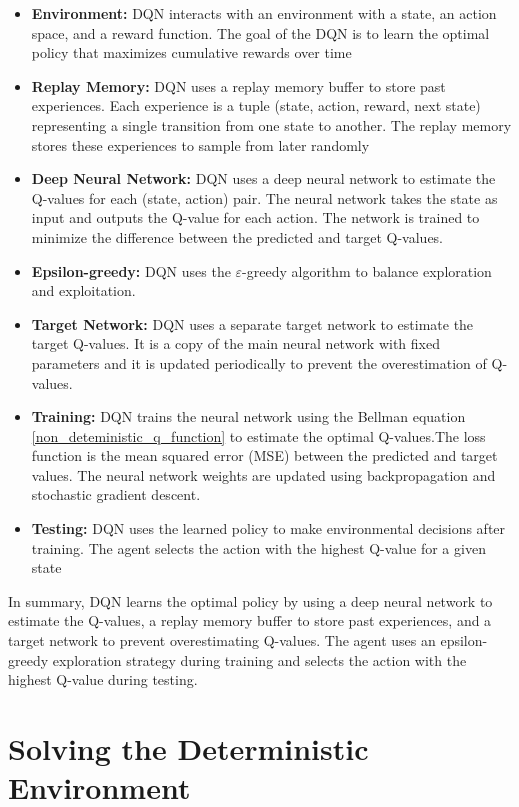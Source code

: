 \begin{itemize}
    \item \textbf{Environment:} DQN interacts with an environment with a state, an action space, and a reward function. 
    The goal of the DQN is to learn the optimal policy that maximizes cumulative rewards over time
    \item \textbf{Replay Memory:} DQN uses a replay memory buffer to store past experiences. 
    Each experience is a tuple (state, action, reward, next state) representing a single transition from one state to another. 
    The replay memory stores these experiences to sample from later randomly
    \item \textbf{Deep Neural Network:} DQN uses a deep neural network to estimate the Q-values for each (state, action) pair.
     The neural network takes the state as input and outputs the Q-value for each action. 
     The network is trained to minimize the difference between the predicted and target Q-values.
    \item \textbf{Epsilon-greedy:} DQN uses the $\varepsilon$-greedy algorithm to balance exploration and exploitation.
    \item \textbf{Target Network:} DQN uses a separate target network to estimate the target Q-values. It is a copy of the 
        main neural network with fixed parameters and it is updated periodically to prevent the overestimation of Q-values.
    \item \textbf{Training:} DQN trains the neural network using the Bellman equation \ref{non_deteministic_q_function} 
    to estimate the optimal Q-values.The loss function is the mean squared error (MSE) between the predicted and target values. 
    The neural network weights are updated using backpropagation and stochastic gradient descent.
    \item \textbf{Testing:} DQN uses the learned policy to make environmental decisions after training. 
    The agent selects the action with the highest Q-value for a given state
\end{itemize}
In summary, DQN learns the optimal policy by using a deep neural network to estimate the Q-values, 
a replay memory buffer to store past experiences, and a target network to prevent overestimating Q-values. 
The agent uses an epsilon-greedy exploration strategy during training and selects the action with the highest Q-value 
during testing.
\section{Solving the Deterministic Environment}
